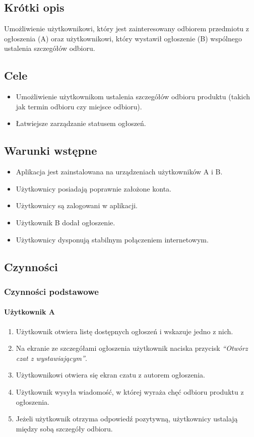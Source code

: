 \documentclass[licencjacka]{pracamgr}
\begin{document}
    \subsection{Krótki opis}
    Umożliwienie użytkownikowi, który jest zainteresowany odbiorem przedmiotu z ogłoszenia (A) oraz użytkownikowi, który wystawił ogłoszenie (B) wspólnego ustalenia szczegółów odbioru.
    \subsection{Cele}
    \begin{itemize}
        \item Umożliwienie użytkownikom ustalenia szczegółów odbioru produktu (takich jak termin odbioru czy miejsce odbioru).
        \item Łatwiejsze zarządzanie statusem ogłoszeń.
    \end{itemize}
    \subsection{Warunki wstępne}
    \begin{itemize}
        \item Aplikacja jest zainstalowana na urządzeniach użytkowników A i B.
        \item Użytkownicy posiadają poprawnie założone konta.
        \item Użytkownicy są zalogowani w aplikacji.
        \item Użytkownik B dodał ogłoszenie.
        \item Użytkownicy dysponują stabilnym połączeniem internetowym.
    \end{itemize}
    \subsection{Czynności}
    \subsubsection{Czynności podstawowe}
    \paragraph{Użytkownik A}
    \begin{enumerate}
        \item Użytkownik otwiera listę dostępnych ogłoszeń i wskazuje jedno z nich.
        \item Na ekranie ze szczegółami ogłoszenia użytkownik naciska przycisk \textit{``Otwórz czat z wystawiającym''}.
        \item Użytkownikowi otwiera się ekran czatu z autorem ogłoszenia.
        \item Użytkownik wysyła wiadomość, w której wyraża chęć odbioru produktu z ogłoszenia.
        \item Jeżeli użytkownik otrzyma odpowiedź pozytywną, użytkownicy ustalają między sobą szczegóły odbioru.
    \end{enumerate}
\end{document}
